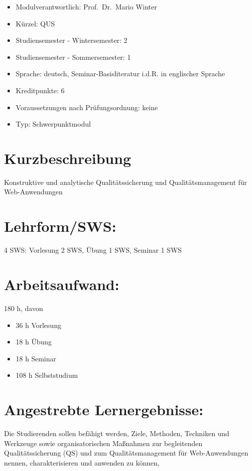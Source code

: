 \begin{itemize}
\tightlist
\item
  Modulverantwortlich: Prof.~Dr.~Mario Winter
\item
  Kürzel: QUS
\item
  Studiensemester - Wintersemester: 2
\item
  Studiensemester - Sommersemester: 1
\item
  Sprache: deutsch, Seminar-Basisliteratur i.d.R. in englischer Sprache
\item
  Kreditpunkte: 6
\item
  Voraussetzungen nach Prüfungsordnung: keine
\item
  Typ: Schwerpunktmodul
\end{itemize}

\section*{Kurzbeschreibung}\label{kurzbeschreibung-11}

Konstruktive und analytische Qualitätssicherung und Qualitätsmanagement
für Web-Anwendungen

\section*{Lehrform/SWS:}\label{lehrformsws-21}

4 SWS: Vorlesung 2 SWS, Übung 1 SWS, Seminar 1 SWS

\section*{Arbeitsaufwand:}\label{arbeitsaufwand-27}

180 h, davon

\begin{itemize}
\item
  36 h Vorlesung
\item
  18 h Übung
\item
  18 h Seminar
\item
  108 h Selbststudium
\end{itemize}

\section*{Angestrebte
Lernergebnisse:}\label{angestrebte-lernergebnisse-21}

Die Studierenden sollen befähigt werden, Ziele, Methoden, Techniken und
Werkzeuge sowie organisatorischen Maßnahmen zur begleitenden
Qualitätssicherung (QS) und zum Qualitätsmanagement für Web-Anwendungen
nennen, charakterisieren und anwenden zu können,

